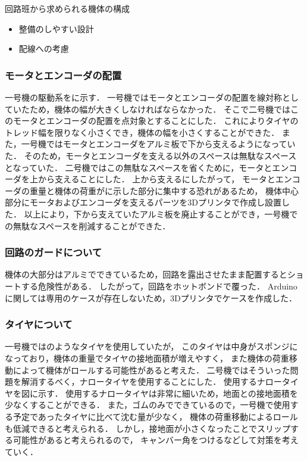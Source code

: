 \documentclass[11pt,a4]{jsarticle}
\begin{document}
      回路班から求められる機体の構成
      \begin{itemize}
       \item 整備のしやすい設計
       \item 配線への考慮
      \end{itemize}


    \subsubsection{モータとエンコーダの配置}
      一号機の駆動系をに示す．
      一号機ではモータとエンコーダの配置を線対称としていたため，機体の幅が大きくしなければならなかった．
      そこで二号機ではこのモータとエンコーダの配置を点対象とすることにした．
      これによりタイヤのトレッド幅を限りなく小さくでき，機体の幅を小さくすることができた．
      また，一号機ではモータとエンコーダをアルミ板で下から支えるようになっていた．
      そのため，モータとエンコーダを支える以外のスペースは無駄なスペースとなっていた．
      二号機ではこの無駄なスペースを省くために，モータとエンコーダを上から支えることにした．
      上から支えるにしたがって，
      モータとエンコーダの重量と機体の荷重がに示した部分に集中する恐れがあるため，
      機体中心部分にモータおよびエンコーダを支えるパーツを3Dプリンタで作成し設置した．
      以上により，下から支えていたアルミ板を廃止することができ，一号機での無駄なスペースを削減することができた．

    \subsubsection{回路のガードについて}
      機体の大部分はアルミでできているため，回路を露出させたまま配置するとショートする危険性がある．
      したがって，回路をホットボンドで覆った．
      Arduinoに関しては専用のケースが存在しないため，3Dプリンタでケースを作成した．

    \subsubsection{タイヤについて}
      一号機ではのようなタイヤを使用していたが，
      このタイヤは中身がスポンジになっており，機体の重量でタイヤの接地面積が増えやすく，
      また機体の荷重移動によって機体がロールする可能性があると考えた．
      二号機ではそういった問題を解消するべく，ナロータイヤを使用することにした．
      使用するナロータイヤを図に示す．
      使用するナロータイヤは非常に細いため，地面との接地面積を少なくすることができる．
      また，ゴムのみでできているので，一号機で使用する予定であったタイヤに比べて沈む量が少なく，
      機体の荷重移動によるロールも低減できると考えられる．
      しかし，接地面が小さくなったことでスリップする可能性があると考えられるので，
      キャンバー角をつけるなどして対策を考えていく．
\end{document}
